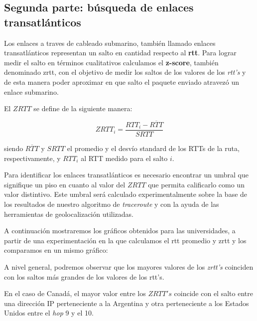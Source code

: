 \subsection{Segunda parte: búsqueda de enlaces transatlánticos}

Los enlaces a traves de cableado submarino, también llamado enlaces transatlánticos representan un salto en cantidad respecto al \textbf{rtt}. Para lograr medir el salto en términos cualitativos calculamos el \textbf{z-score}, también denominado zrtt, con el objetivo de medir los saltos de los valores de los \textit{rtt's} y de esta manera poder aproximar en que salto el paquete enviado atravezó un enlace submarino.

El $ZRTT$ se define de la siguiente manera:

\begin{equation}
 ZRTT_i = \frac{RTT_i - \overline{RTT}}{SRTT}
\end{equation}

siendo $\overline{RTT}$ y $SRTT$ el promedio y el desv\'io standard de los RTTs de la ruta, respectivamente, y $RTT_i$ al RTT medido para el salto $i$.

Para identificar los enlaces transatlánticos es necesario encontrar un umbral que signifique un piso en cuanto al valor del $ZRTT$ que permita calificarlo como un valor distintivo. Este umbral será calculado experimentalmente sobre la base de los resultados de nuestro algoritmo de \textit{traceroute} y con la ayuda de las herramientas de geolocalización utilizadas.

A continuaci\'on mostraremos los gr\'aficos obtenidos para las universidades, a partir de una experimentaci\'on en la que calculamos el rtt promedio y zrtt y los comparamos en un mismo gr\'afico:

A nivel general, podremos observar que los mayores valores de los \textit{zrtt's} coinciden con los saltos más grandes de los valores de los rtt's.


En el caso de Canadá, el mayor valor entre los $ZRTT's$ coincide con el salto entre una dirección IP perteneciente a la Argentina y otra perteneciente a los Estados Unidos entre el \textit{hop} 9 y el 10.


